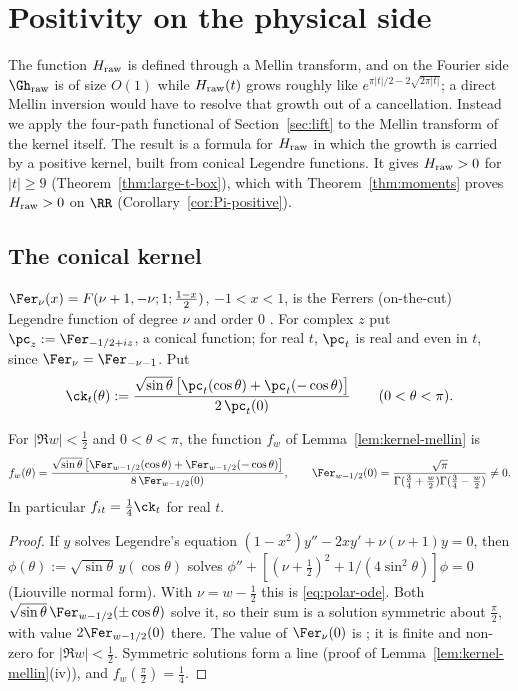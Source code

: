 \section{Positivity on the physical side}\label{sec:physical}

The function $H_{\rm raw}$ is defined through a Mellin transform, and on the Fourier side $\Gh_{\rm raw}$ is of size $O(1)$ while $H_{\rm raw}(t)$
grows roughly like $e^{\pi|t|/2-2\sqrt{2\pi|t|}}$; a direct Mellin inversion would have to resolve that growth out of a cancellation. Instead we
apply the four-path functional of Section~\ref{sec:lift} to the Mellin transform of the kernel itself. The result is a formula for $H_{\rm raw}$ in
which the growth is carried by a positive kernel, built from conical Legendre functions. It gives $H_{\rm raw}>0$ for $|t|\ge9$
(Theorem~\ref{thm:large-t-box}), which with Theorem~\ref{thm:moments} proves $H_{\rm raw}>0$ on $\RR$ (Corollary~\ref{cor:Pi-positive}).

\subsection{The conical kernel}

$\Fer_\nu(x)=F(\nu+1,-\nu;1;\frac{1-x}2)$, $-1<x<1$, is the Ferrers (on-the-cut) Legendre function of degree $\nu$ and order $0$
\cite[14.3.1]{DLMF}. For complex $z$ put $\pc_z:=\Fer_{-1/2+iz}$, a conical function; for real $t$, $\pc_t$ is real and even in $t$, since $\Fer_\nu=\Fer_{-\nu-1}$. Put
\begin{equation}\label{eq:ck}
\ck_t(\theta):=\frac{\sqrt{\sin\theta}\,\big[\pc_t(\cos\theta)+\pc_t(-\cos\theta)\big]}{2\,\pc_t(0)}\qquad(0<\theta<\pi).
\end{equation}

\begin{lemma}\label{lem:conical}
For $|\Re w|<\frac12$ and $0<\theta<\pi$, the function $f_w$ of Lemma~\ref{lem:kernel-mellin} is
\[
f_w(\theta)=\frac{\sqrt{\sin\theta}\,\big[\Fer_{w-1/2}(\cos\theta)+\Fer_{w-1/2}(-\cos\theta)\big]}{8\,\Fer_{w-1/2}(0)},\qquad
\Fer_{w-1/2}(0)=\frac{\sqrt\pi}{\Gamma(\frac34+\frac w2)\Gamma(\frac34-\frac w2)}\ne0 .
\]
In particular $f_{it}=\frac14\ck_t$ for real $t$.
\end{lemma}

\begin{proof}
If $y$ solves Legendre's equation $(1-x^2)y''-2xy'+\nu(\nu+1)y=0$, then $\phi(\theta):=\sqrt{\sin\theta}\,y(\cos\theta)$ solves
$\phi''+[(\nu+\frac12)^2+1/(4\sin^2\theta)]\phi=0$ (Liouville normal form). With $\nu=w-\frac12$ this is \eqref{eq:polar-ode}. Both
$\sqrt{\sin\theta}\,\Fer_{w-1/2}(\pm\cos\theta)$ solve it, so their sum is a solution symmetric about $\frac\pi2$, with value $2\Fer_{w-1/2}(0)$ there.
The value of $\Fer_\nu(0)$ is \cite[14.5.1]{DLMF}; it is finite and non-zero for $|\Re w|<\frac12$. Symmetric solutions form a line
(proof of Lemma~\ref{lem:kernel-mellin}(iv)), and $f_w(\frac\pi2)=\frac14$.
\end{proof}

